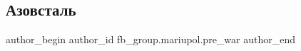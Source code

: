  
 
 
 
 

\subsection{Азовсталь}
\label{sec:05_02_2023.fb.fb_group.mariupol.pre_war.4.azovstal}

\ifcmt
 author_begin
   author_id fb_group.mariupol.pre_war
 author_end
\fi
